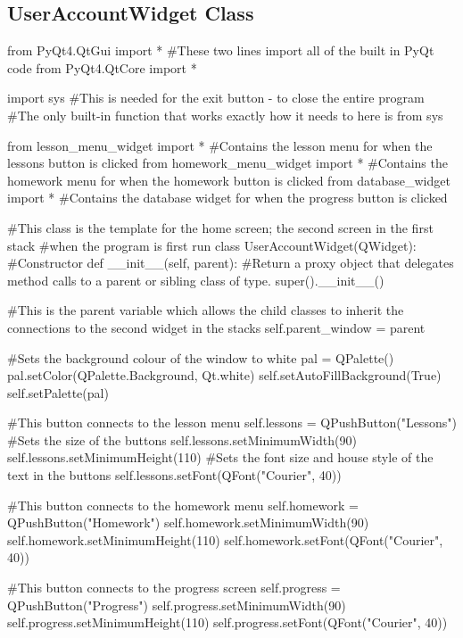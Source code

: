\begin{landscape}
\subsection{UserAccountWidget Class}

\begin{python}
from PyQt4.QtGui import * #These two lines import all of the built in PyQt code
from PyQt4.QtCore import *

import sys #This is needed for the exit button - to close the entire program
#The only built-in function that works exactly how it needs to here is from sys

from lesson_menu_widget import * #Contains the lesson menu for when the lessons button is clicked
from homework_menu_widget import * #Contains the homework menu for when the homework button is clicked
from database_widget import * #Contains the database widget for when the progress button is clicked

#This class is the template for the home screen; the second screen in the first stack
#when the program is first run
class UserAccountWidget(QWidget):
    #Constructor
    def __init__(self, parent):
        #Return a proxy object that delegates method calls to a parent or sibling class of type.
        super().__init__()
        
        #This is the parent variable which allows the child classes to inherit the connections to the second widget in the stacks       
        self.parent_window = parent

        #Sets the background colour of the window to white
        pal = QPalette()
        pal.setColor(QPalette.Background, Qt.white)
        self.setAutoFillBackground(True)
        self.setPalette(pal)

        #This button connects to the lesson menu
        self.lessons = QPushButton("Lessons")
        #Sets the size of the buttons
        self.lessons.setMinimumWidth(90)
        self.lessons.setMinimumHeight(110)
        #Sets the font size and house style of the text in the buttons
        self.lessons.setFont(QFont("Courier", 40))

        #This button connects to the homework menu        
        self.homework = QPushButton("Homework")
        self.homework.setMinimumWidth(90)
        self.homework.setMinimumHeight(110)
        self.homework.setFont(QFont("Courier", 40))

        #This button connects to the progress screen
        self.progress = QPushButton("Progress")
        self.progress.setMinimumWidth(90)
        self.progress.setMinimumHeight(110)
        self.progress.setFont(QFont("Courier", 40))
        

\end{python}
\end{landscape}
